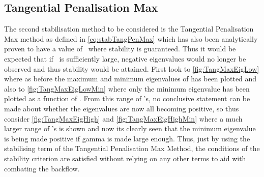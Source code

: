 \subsection{Tangential Penalisation Max}
The second stabilisation method to be considered is the Tangential Penalisation Max method as defined in \autoref{eq:stabTangPenMax} which has also been analytically proven to have a value of \mgamma~where stability is guaranteed. Thus it would be expected that if \mgamma~is sufficiently large, negative eigenvalues would no longer be observed and thus stability would be attained. First look to \autoref{fig:TangMaxEigLow} where as before the maximum and minimum eigenvalues of  has been plotted and also to \autoref{fig:TangMaxEigLowMin} where only the minimum eigenvalue has been plotted as a function of \mgamma. From this range of \mgamma's, no conclusive statement can be made about whether the eigenvalues are now all becoming positive, so thus consider \autoref{fig:TangMaxEigHigh} and \autoref{fig:TangMaxEigHighMin} where a much larger range of \mgamma's is shown and now its clearly seen that the minimum eigenvalue is being made positive if gamma is made large enough. Thus, just by using the stabilising term of the Tangential Penalisation Max Method, the conditions of the stability criterion are satisfied without relying on any other terms to aid with combating the backflow.
